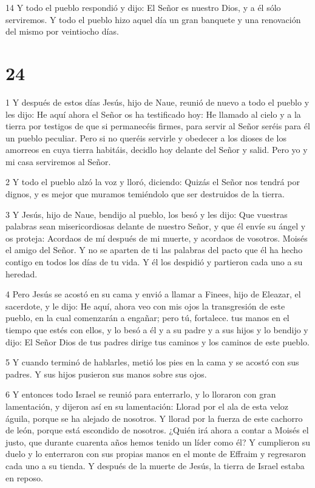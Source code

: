\par 14 Y todo el pueblo respondió y dijo: El Señor es nuestro Dios, y a él sólo serviremos. Y todo el pueblo hizo aquel día un gran banquete y una renovación del mismo por veintiocho días.

\chapter{24}

\par 1 Y después de estos días Jesús, hijo de Naue, reunió de nuevo a todo el pueblo y les dijo: He aquí ahora el Señor os ha testificado hoy: He llamado al cielo y a la tierra por testigos de que si permanecéis firmes, para servir al Señor seréis para él un pueblo peculiar. Pero si no queréis servirle y obedecer a los dioses de los amorreos en cuya tierra habitáis, decidlo hoy delante del Señor y salid. Pero yo y mi casa serviremos al Señor.

\par 2 Y todo el pueblo alzó la voz y lloró, diciendo: Quizás el Señor nos tendrá por dignos, y es mejor que muramos temiéndolo que ser destruidos de la tierra.

\par 3 Y Jesús, hijo de Naue, bendijo al pueblo, los besó y les dijo: Que vuestras palabras sean misericordiosas delante de nuestro Señor, y que él envíe su ángel y os proteja: Acordaos de mí después de mi muerte, y acordaos de vosotros. Moisés el amigo del Señor. Y no se aparten de ti las palabras del pacto que él ha hecho contigo en todos los días de tu vida. Y él los despidió y partieron cada uno a su heredad.

\par 4 Pero Jesús se acostó en su cama y envió a llamar a Finees, hijo de Eleazar, el sacerdote, y le dijo: He aquí, ahora veo con mis ojos la transgresión de este pueblo, en la cual comenzarán a engañar; pero tú, fortalece. tus manos en el tiempo que estés con ellos, y lo besó a él y a su padre y a sus hijos y lo bendijo y dijo: El Señor Dios de tus padres dirige tus caminos y los caminos de este pueblo.

\par 5 Y cuando terminó de hablarles, metió los pies en la cama y se acostó con sus padres. Y sus hijos pusieron sus manos sobre sus ojos.

\par 6 Y entonces todo Israel se reunió para enterrarlo, y lo lloraron con gran lamentación, y dijeron así en su lamentación: Llorad por el ala de esta veloz águila, porque se ha alejado de nosotros. Y llorad por la fuerza de este cachorro de león, porque está escondido de nosotros. ¿Quién irá ahora a contar a Moisés el justo, que durante cuarenta años hemos tenido un líder como él? Y cumplieron su duelo y lo enterraron con sus propias manos en el monte de Effraim y regresaron cada uno a su tienda. Y después de la muerte de Jesús, la tierra de Israel estaba en reposo.

